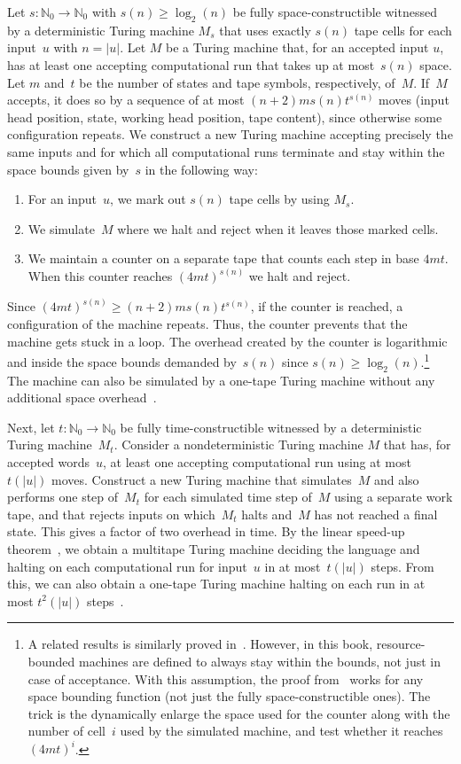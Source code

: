 Let $s \colon \mathbb N_0 \to \mathbb N_0$ with $s(n) \ge \log_2(n)$ be fully space-constructible 
witnessed by a deterministic Turing machine $M_s$ that 
uses exactly $s(n)$ tape cells for each input~$u$ with $n = |u|$.
Let $M$ be a Turing machine that, for an accepted input $u$, has at least one accepting
computational run that takes up at most~$s(n)$ space.
Let $m$ and~$t$ be the number of states and tape symbols, respectively, of~$M$.
If~$M$ accepts, it does so by a sequence of at most 
$(n+2)ms(n)t^{s(n)}$ moves (input head position, state, working head
position, tape content), since otherwise some configuration repeats.
We construct a new Turing machine accepting precisely the same inputs
and for which all computational runs terminate and stay within
the space bounds given by~$s$ in the following way:
\begin{enumerate}
\item For an input~$u$, we mark out $s(n)$ tape cells by using $M_s$.
 
\item We simulate~$M$ where we halt and reject when it leaves those marked cells.

\item We maintain a counter on a separate tape that counts each step in base $4mt$. When
this counter reaches $(4mt)^{s(n)}$ we halt and reject.
\end{enumerate}
Since $(4mt)^{s(n)} \ge (n+2)ms(n)t^{s(n)}$, if the counter
is reached, a configuration of the machine repeats. Thus, the counter prevents
that the machine gets stuck in a loop.
The overhead created by the counter is logarithmic and inside the space bounds 
demanded by~$s(n)$ since $s(n) \ge \log_2(n)$.\footnote{A related results
	is similarly proved in~\cite[Lem.~12.1]{HopUll79}. However, 
	in this book, resource-bounded machines are defined
	to always stay within the bounds, not just in 
	case of acceptance. With this assumption,
	the proof from~\cite[Lem.~12.1]{HopUll79}
	works for any space bounding function (not just the fully space-constructible ones).
	The trick is the dynamically enlarge the space used for the counter
	along with the number of cell~$i$ used by the simulated machine, and test
	whether it reaches $(4mt)^i$.}
The machine can also be simulated by a one-tape Turing machine
without any additional space overhead~\cite[Proof of Thm.~7.2]{HopUll79}.

Next, let $t \colon \mathbb N_0 \to \mathbb N_0$ be  fully time-constructible witnessed
by a deterministic Turing machine~$M_t$.
Consider a nondeterministic Turing machine $M$
that has, for accepted words~$u$, at least one accepting computational
run using at most~$t(|u|)$ moves.
Construct a new Turing machine that simulates~$M$ and also performs one step of~$M_t$
for each simulated time step of~$M$ using a separate work tape,
and that rejects inputs on which~$M_t$ halts and~$M$ has not reached a final state.
This gives a factor of two overhead in time. By the linear speed-up theorem~\cite[Thm.~12.3]{HopUll79},
we obtain a multitape Turing machine deciding the language and halting on each computational run
for input~$u$ in at most~$t(|u|)$ steps. From this, we can also obtain a one-tape Turing
machine halting on each run in at most $t^2(|u|)$ steps~\cite[p.~292]{HopUll79}.

